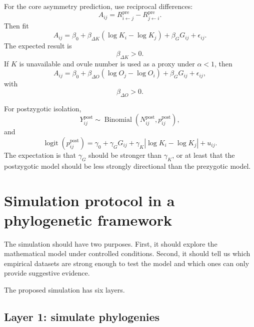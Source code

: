 \documentclass[11pt]{article}
\newcommand{\Rpre}{R^{\mathrm{pre}}}
\newcommand{\logit}{\operatorname{logit}}
\begin{document}
For the core asymmetry prediction, use reciprocal differences:
\begin{equation}
A_{ij}=\Rpre_{i\leftarrow j}-\Rpre_{j\leftarrow i}.
\end{equation}
Then fit
\begin{equation}
A_{ij}=\beta_0+\beta_{\Delta K}(\log K_i-\log K_j)+\beta_GG_{ij}+\epsilon_{ij}.
\label{eq:asymmetry_model_K}
\end{equation}
The expected result is
\begin{equation}
\beta_{\Delta K}>0.
\end{equation}
If \(K\) is unavailable and ovule number is used as a proxy under \(\alpha<1\), then
\begin{equation}
A_{ij}=\beta_0+\beta_{\Delta O}(\log O_j-\log O_i)+\beta_GG_{ij}+\epsilon_{ij},
\label{eq:asymmetry_model_O}
\end{equation}
with
\begin{equation}
\beta_{\Delta O}>0.
\end{equation}

For postzygotic isolation,
\begin{equation}
Y^{\mathrm{post}}_{ij}\sim \operatorname{Binomial}(N^{\mathrm{post}}_{ij},p^{\mathrm{post}}_{ij}),
\end{equation}
and
\begin{equation}
\logit\left(p^{\mathrm{post}}_{ij}\right)
=
\gamma_0+\gamma_GG_{ij}+\gamma_K|\log K_i-\log K_j|+u_{ij}.
\label{eq:empirical_post_model}
\end{equation}
The expectation is that \(\gamma_G\) should be stronger than \(\gamma_K\), or at least that the postzygotic model should be less strongly directional than the prezygotic model.

\section{Simulation protocol in a phylogenetic framework}

The simulation should have two purposes. First, it should explore the mathematical model under controlled conditions. Second, it should tell us which empirical datasets are strong enough to test the model and which ones can only provide suggestive evidence.

The proposed simulation has six layers.

\subsection{Layer 1: simulate phylogenies}
\end{document}
